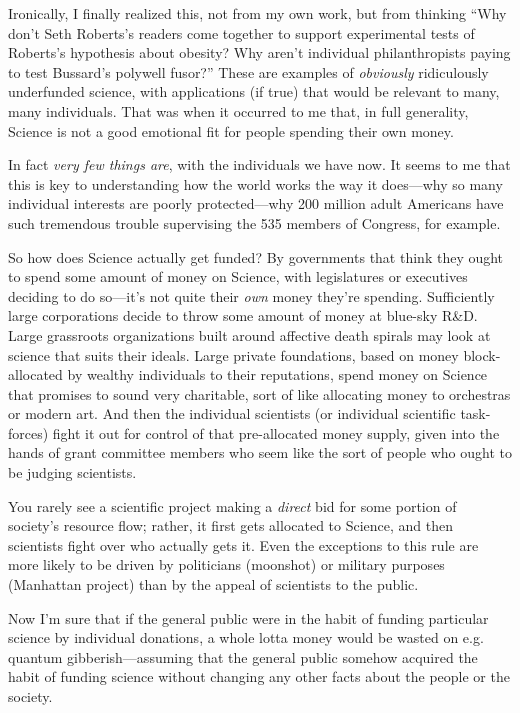 {
 Ironically, I finally realized this, not from my own work, but
from thinking ``Why don't Seth
Roberts's readers come together to support experimental
tests of Roberts's hypothesis about obesity? Why
aren't individual philanthropists paying to test
Bussard's polywell fusor?'' These are
examples of \textit{obviously} ridiculously underfunded science, with
applications (if true) that would be relevant to many, many
individuals. That was when it occurred to me that, in full generality,
Science is not a good emotional fit for people spending their own
money.}

{
 In fact \textit{very few things are}, with the individuals we have
now. It seems to me that this is key to understanding how the world
works the way it does---why so many individual interests are poorly
protected---why 200 million adult Americans have such tremendous
trouble supervising the 535 members of Congress, for example.}

{
 So how does Science actually get funded? By governments that think
they ought to spend some amount of money on Science, with legislatures
or executives deciding to do so---it's not quite their
\textit{own} money they're spending. Sufficiently large
corporations decide to throw some amount of money at blue-sky R\&D.
Large grassroots organizations built around affective death spirals may
look at science that suits their ideals. Large private foundations,
based on money block-allocated by wealthy individuals to their
reputations, spend money on Science that promises to sound very
charitable, sort of like allocating money to orchestras or modern art.
And then the individual scientists (or individual scientific
task-forces) fight it out for control of that pre-allocated money
supply, given into the hands of grant committee members who seem like
the sort of people who ought to be judging scientists.}

{
 You rarely see a scientific project making a \textit{direct} bid
for some portion of society's resource flow; rather, it
first gets allocated to Science, and then scientists fight over who
actually gets it. Even the exceptions to this rule are more likely to
be driven by politicians (moonshot) or military purposes (Manhattan
project) than by the appeal of scientists to the public.}

{
 Now I'm sure that if the general public were in
the habit of funding particular science by individual donations, a
whole lotta money would be wasted on e.g. quantum gibberish---assuming
that the general public somehow acquired the habit of funding science
without changing any other facts about the people or the society.}

